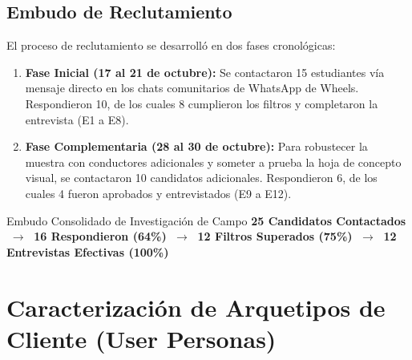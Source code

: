 \documentclass[11pt,a4paper]{article}
\begin{document}
\subsection{Embudo de Reclutamiento}
El proceso de reclutamiento se desarroll\'o en dos fases cronol\'ogicas:
\begin{enumerate}
    \item \textbf{Fase Inicial (17 al 21 de octubre):} Se contactaron 15 estudiantes v\'ia mensaje directo en los chats comunitarios de WhatsApp de Wheels. Respondieron 10, de los cuales 8 cumplieron los filtros y completaron la entrevista (E1 a E8).
    \item \textbf{Fase Complementaria (28 al 30 de octubre):} Para robustecer la muestra con conductores adicionales y someter a prueba la hoja de concepto visual, se contactaron 10 candidatos adicionales. Respondieron 6, de los cuales 4 fueron aprobados y entrevistados (E9 a E12).
\end{enumerate}

\begin{externadobox}{Embudo Consolidado de Investigaci\'on de Campo}
\centering
\textbf{25 Candidatos Contactados} $\;\longrightarrow\;$ \textbf{16 Respondieron (64\%)} $\;\longrightarrow\;$ \textbf{12 Filtros Superados (75\%)} $\;\longrightarrow\;$ \textbf{12 Entrevistas Efectivas (100\%)}
\end{externadobox}

\section{Caracterizaci\'on de Arquetipos de Cliente (User Personas)}
\end{document}
